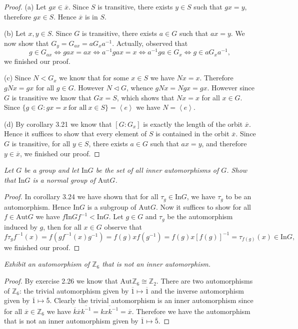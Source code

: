 \begin{proof}
(a) Let $gx\in\overline{x}$. Since $S$ is transitive, there exists $y\in S$ such that $gx=y$, therefore $gx\in S$. Hence $\overline{x}$ is in $S$.\par
(b) Let $x,y\in S$. Since $G$ is transitive, there exists $a\in G$ such that $ax=y$. We now show that $G_y=G_{ax}=aG_xa^{-1}$. Actually, observed that 
$$
g\in G_{ax}\Leftrightarrow gax=ax\Leftrightarrow a^{-1}gax=x\Leftrightarrow a^{-1}ga\in G_x\Leftrightarrow g\in aG_xa^{-1},
$$
we finished our proof.\par
(c) Since $N<G_x$ we know that for some $x\in S$ we have $Nx=x$. Therefore $gNx=gx$ for all $g\in G$. However $N\lhd G$, whence  $gNx=Ngx=gx$. However since $G$ is transitive we know that $Gx=S$, which shows that $Nx=x$ for all $x\in G$. Since $\{g\in G:gx=x\ \text{for all}\ x\in S\}=\left<e\right>$ we have $N=\left<e\right>$.\par
(d) By corollary 3.21 we know that $[G:G_x]$ is exactly the length of the orbit $\overline{x}$. Hence it suffices to show that every element of $S$ is contained in the orbit $\overline{x}$. Since $G$ is transitive, for all $y\in S$, there exists $a\in G$ such that $ax=y$, and therefore $y\in\overline{x}$, we finished our proof.
\end{proof}
\begin{problem}\em
Let $G$ be a group and let $\mathrm{In}G$ be the set of all inner automorphisms of $G$. Show that $\mathrm{In}G$ is a normal group of $\mathrm{Aut}G$.
\end{problem}
\begin{proof}
In corollary 3.24 we have shown that for all $\tau_g\in\mathrm{In}G$, we have $\tau_g$ to be an automorphism. Hence $\mathrm{In}G$ is a subgroup of $\mathrm{Aut}G$. Now it suffices to show for all $f\in\mathrm{Aut}G$ we have $f\mathrm{In}Gf^{-1}<\mathrm{In}G$. Let $g\in G$ and $\tau_g$ be the automorphism induced by $g$, then for all $x\in G$ observe that 
$$f\tau_g f^{-1}(x)=f(gf^{-1}(x)g^{-1})=f(g)xf(g^{-1})=f(g)x[f(g)]^{-1}=\tau_{f(g)}(x)\in\mathrm{In}G,$$
we finished our proof.
\end{proof}
\begin{problem}\em
Exhibit an automorphism of $\mathbb{Z}_6$ that is not an inner automorphism.
\end{problem}
\begin{proof}
By exercise 2.26 we know that $\mathrm{Aut}\mathbb{Z}_6\cong\mathbb{Z}_2$. There are two automorphisms of $\mathbb{Z}_6$: the trivial automorphism given by $\overline{1}\mapsto\overline{1}$ and the inverse automorphism given by $\overline{1}\mapsto\overline{5}$. Clearly the trivial automorphism is an inner automorphism since for all $\overline{x}\in\mathbb{Z}_6$ we have $\overline{k}\overline{x}\overline{k^{-1}}=\overline{kxk^{-1}}=\overline{x}$. Therefore we have the automorphism that is not an inner automorphism given by $\overline{1}\mapsto\overline{5}$.
\end{proof}
